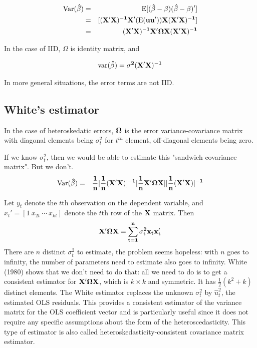 \begin{eqnarray}
{\rm Var} \bf (\hat \beta) & = & {\rm E}\bf [(\hat \beta
-\beta)(\hat
\beta -\beta)'] \\
& = & \bf [(X'X)^{-1}X'({\rm E}(uu'))X(X'X)^{-1}] \nonumber \\
& = & \bf  (X'X)^{-1} X' \Omega X (X'X)^{-1} \nonumber
\end{eqnarray}

In the case of IID, $\Omega$ is identity matrix, and 

\begin{eqnarray}
{\rm var} \bf (\hat \beta)  =  \bf  \sigma^2 (X'X)^{-1} \nonumber
\end{eqnarray}

In more general situations, the error terms are not IID.  


\subsection{White's estimator}

In the case of heteroskedatic errors, $\bf \Omega$ is the error
variance-covariance matrix with diagonal elements being $\sigma_t^2$
for $t^{th}$ element, off-diagonal elements being zero.

If we know $\sigma_t^2$, then we would be able to estimate this
"sandwich covariance matrix".  But we don't.
\begin{eqnarray}
{\rm Var} \bf (\hat \beta) & = & \bf \frac{1}{n}
[\frac{1}{n}(X'X)]^{-1}[\frac{1}{n}X'\Omega
X][\frac{1}{n}(X'X)]^{-1} \nonumber
\end{eqnarray}

Let $y_t$ denote the $t$th observation on the dependent variable,
and $x_t'=[1 \ x_{2t} \  \cdots  \ x_{kt}]$ denote the $t$th row of the
$\bf X$ matrix.  Then
\begin{equation}
\bf X' \Omega X=\sum_{t=1}^n \sigma_t^2 x_t x_t'
\end{equation}
There are $n$ distinct $\sigma_t^2$ to estimate, the problem seems
hopeless: with $n$ goes to infinity, the number of parameters need to
estimate also goes to infinity.  White (1980) shows that we don't need
to do that: all we need to do is to get a consistent estimator for
$\bf X' \Omega X$, which is $k \times k$ and symmetric.  It has
$\frac{1}{2} (k^2+k)$ distinct elements.  The White estimator replaces
the unknown $\sigma_t^2$ by $\hat u_t^2$, the estimated OLS residuals.
This provides a consistent estimator of the variance matrix for the
OLS coefficient vector and is particularly useful since it does not
require any specific assumptions about the form of the
heteroscedasticity.  This type of estimator is also called
heteroskedasticity-consistent covariance matrix estimator.

